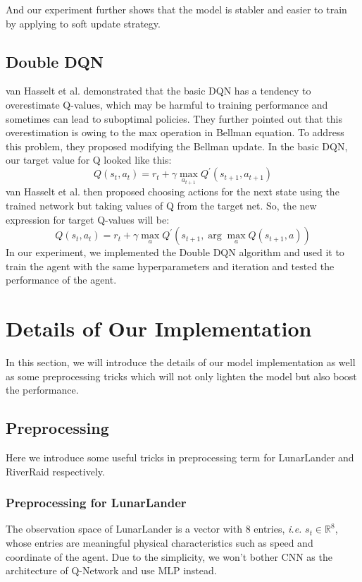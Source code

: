 \documentclass[12pt]{article}
\begin{document}
And our experiment further shows that the model is stabler and easier to train by applying to soft update strategy.


\subsection{Double DQN}
van Hasselt et al.\cite{hasselt2015deep} demonstrated that the basic DQN has a tendency to overestimate Q-values, which may be harmful to training performance and sometimes can lead to suboptimal policies. They further pointed out that this overestimation is owing to the max operation in Bellman equation. To address this problem, they proposed modifying the Bellman update. In the basic DQN, our target value for Q looked like this:
\begin{equation}
    Q\left(s_{t}, a_{t}\right)=r_{t}+\gamma \max _{a_{t+1}} Q^{\prime}\left(s_{t+1}, a_{t+1}\right)
\end{equation}
van Hasselt et al. then proposed choosing actions for the next state using the trained network but taking values of Q from the target net. So, the new expression for target Q-values will be:
\begin{equation}
    Q\left(s_{t}, a_{t}\right)=r_{t}+\gamma \max _{a} Q^{\prime}\left(s_{t+1}, \arg \max _{a} Q\left(s_{t+1}, a\right)\right)
\end{equation}
In our experiment, we implemented the Double DQN algorithm and used it to train the agent with the same hyperparameters and iteration and tested the performance of the agent.



\section{Details of Our Implementation}
In this section, we will introduce the details of our model implementation as well as some preprocessing tricks which will not only lighten the model but also boost the performance.
\subsection{Preprocessing}
Here we introduce some useful tricks in preprocessing term for LunarLander and RiverRaid respectively.
\subsubsection{Preprocessing for LunarLander}
The observation space of LunarLander is a vector with 8 entries, \emph{i.e.} $s_t \in \mathbb{R}^8$, whose entries are meaningful physical characteristics such as speed and coordinate of the agent. Due to the simplicity, we won't bother CNN as the architecture of Q-Network and use MLP instead.
\end{document}
